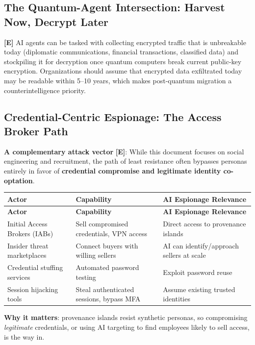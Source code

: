 \documentclass[11pt,letterpaper]{article}
\newcommand{\etraneed}[1]{\par\ifdim\pagegoal<\maxdimen\ifdim\pagetotal<\pagegoal\ifdim\dimexpr\pagegoal-\pagetotal\relax<\dimexpr#1\relax\newpage\fi\fi\fi}
\begin{document}
\subsection{The Quantum-Agent Intersection: Harvest Now, Decrypt Later}

\textbf{[E]} AI agents can be tasked with collecting encrypted traffic that is unbreakable today (diplomatic communications, financial transactions, classified data) and stockpiling it for decryption once quantum computers break current public-key encryption. Organizations should assume that encrypted data exfiltrated today may be readable within 5--10 years, which makes post-quantum migration a counterintelligence priority.

\subsection{Credential-Centric Espionage: The Access Broker Path}

\textbf{A complementary attack vector} \textbf{[E]}: While this document focuses on social engineering and recruitment, the path of least resistance often bypasses personas entirely in favor of \textbf{credential compromise and legitimate identity co-optation}.

\etraneed{11\baselineskip}
{\small
\begin{longtable}{L{3.5cm}L{4cm}L{5cm}}
\toprule
\textbf{Actor} & \textbf{Capability} & \textbf{AI Espionage Relevance} \\
\midrule
\endfirsthead
\toprule
\textbf{Actor} & \textbf{Capability} & \textbf{AI Espionage Relevance} \\
\midrule
\endhead
Initial Access Brokers (IABs) & Sell compromised credentials, VPN access & Direct access to provenance islands \\*
Insider threat marketplaces & Connect buyers with willing sellers & AI can identify/approach sellers at scale \\
Credential stuffing services & Automated password testing & Exploit password reuse \\*
Session hijacking tools & Steal authenticated sessions, bypass MFA & Assume existing trusted identities \\
\bottomrule
\end{longtable}}

\textbf{Why it matters}: provenance islands resist synthetic personas, so compromising \textit{legitimate} credentials, or using AI targeting to find employees likely to sell access, is the way in.
\end{document}
